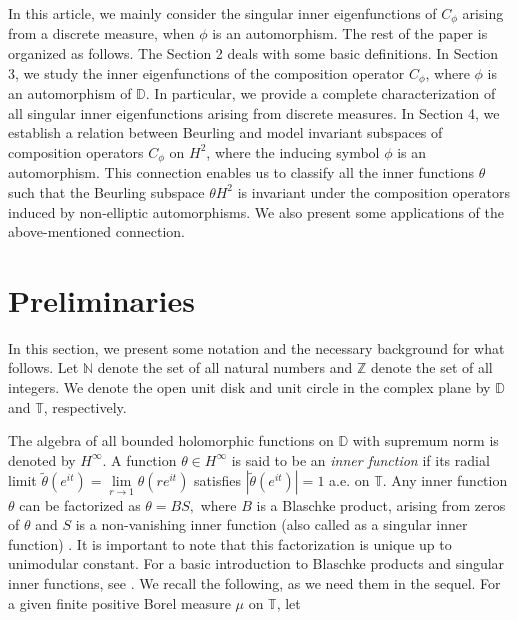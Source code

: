 \documentclass[12pt, reqno]{amsart}
\theoremstyle{definition}
\numberwithin{equation}{section}
\begin{document}
 In this article, we mainly consider the singular inner eigenfunctions  of $C_\phi$ arising from a discrete measure, when $\phi$ is an automorphism. The rest of the paper is organized as follows. The Section 2 deals with some basic definitions.
In Section 3, we study the inner eigenfunctions of the composition operator $C_\phi$, where $\phi$ is an automorphism of $\mathbb{D}$. In particular, we provide a complete characterization of all singular inner eigenfunctions arising from discrete measures.
In Section 4, we establish a relation between Beurling and model invariant subspaces of composition operators  $C_\phi$ on $H^2$, where the inducing symbol $\phi$ is an automorphism.  This connection enables us to classify all the inner functions $\theta$ such that the Beurling subspace $\theta H^2$ is invariant under the composition operators induced by non-elliptic automorphisms. We  also present some applications of the above-mentioned connection.
















\section{Preliminaries}
In this section, we present some notation and the necessary background for what follows.
Let $\mathbb{N}$ denote
the set of all natural numbers and  $\mathbb{Z}$ denote the set of all integers. We denote the open unit disk and unit circle in the complex
plane by $\mathbb{D}$ and $\mathbb{T}$,
respectively.

The algebra of all bounded holomorphic functions on $\mathbb{D}$
with supremum norm is denoted by $H^{\infty}$. A function $\theta\in H^{\infty}$ is said to be an \textit{inner function} if its radial limit $\tilde{\theta}(e^{it})=\lim\limits_{r\rightarrow 1}{\theta}(re^{it})$ satisfies  $|\tilde{\theta}(e^{it})|=1$
a.e. on $\mathbb{T}$. Any inner function $\theta$ can be factorized as
$\theta=BS,$
where $B$ is a Blaschke product, arising from zeros of $\theta$  and $S$ is a non-vanishing inner function (also called as a singular inner function) \cite[Corollary 2.6.6]{texthardy}. It is important to
note that this factorization is
unique up to unimodular constant. For a basic introduction to Blaschke products and singular inner functions, see \cite{duren,texthardy,shapiro1}.
 We recall the following, as we need them in the sequel.
For a given finite positive Borel measure $\mu$ on $\mathbb{T}$, let
\end{document}
